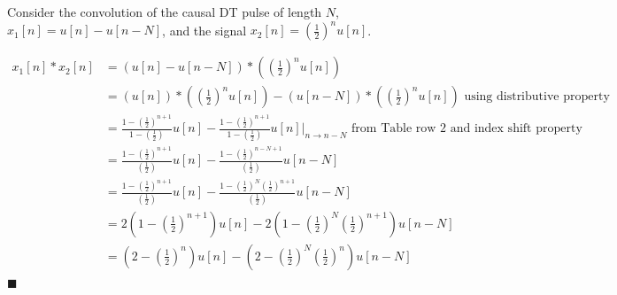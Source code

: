 \begin{example} Consider the convolution of the causal DT pulse of length $N$, $x_1[n] = u[n] - u[n-N]$, and the signal $x_2[n] = \left( \frac{1}{2}\right)^nu[n]$.

  \begin{align*}
    x_1[n] * x_2[n] &= \left( u[n] - u[n-N]\right) * \left( \left( \frac{1}{2}\right)^nu[n] \right)\\
    &= \left( u[n] \right) * \left( \left( \frac{1}{2}\right)^nu[n] \right) - \left( u[n-N]\right) * \left( \left( \frac{1}{2}\right)^nu[n] \right) \mbox{ using distributive property}\\
    &= \frac{1-\left(\frac{1}{2}\right)^{n+1}}{1-\left(\frac{1}{2}\right)}u[n] - \frac{1-\left(\frac{1}{2}\right)^{n+1}}{1-\left(\frac{1}{2}\right)}u[n] \Big|_{n\rightarrow n-N} \mbox{ from Table row 2 and index shift property}\\
    &= \frac{1-\left(\frac{1}{2}\right)^{n+1}}{\left(\frac{1}{2}\right)}u[n] - \frac{1-\left(\frac{1}{2}\right)^{n-N+1}}{\left(\frac{1}{2}\right)}u[n-N]\\
    &= \frac{1-\left(\frac{1}{2}\right)^{n+1}}{\left(\frac{1}{2}\right)}u[n] - \frac{1-\left(\frac{1}{2}\right)^N\left(\frac{1}{2}\right)^{n+1}}{\left(\frac{1}{2}\right)}u[n-N]\\
    &= 2\left(1-\left(\frac{1}{2}\right)^{n+1}\right)u[n] - 2\left(1-\left(\frac{1}{2}\right)^N\left(\frac{1}{2}\right)^{n+1} \right)u[n-N]\\
    &= \left(2-\left(\frac{1}{2}\right)^{n}\right)u[n] - \left(2-\left(\frac{1}{2}\right)^N\left(\frac{1}{2}\right)^{n} \right)u[n-N]
  \end{align*}
$\blacksquare$
\end{example}

